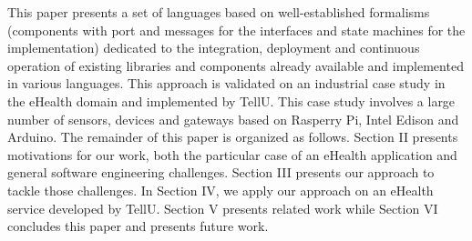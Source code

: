 This paper presents a set of languages based on well-established formalisms (components with port and messages for the interfaces and state machines for the implementation)  dedicated to the integration, deployment and continuous operation of existing libraries and components already available and implemented in various languages. This approach is validated on an industrial case study in the eHealth domain and implemented by TellU. This case study involves a large number of sensors, devices and gateways based on Rasperry Pi, Intel Edison and Arduino. 
The remainder of this paper is organized as follows. Section II presents motivations for our work, both the particular case of an eHealth application and general software engineering challenges. Section III presents our approach to tackle those challenges. In Section IV, we apply our approach on an eHealth service developed by TellU. Section V presents related work while Section VI concludes this paper and presents future work. 

